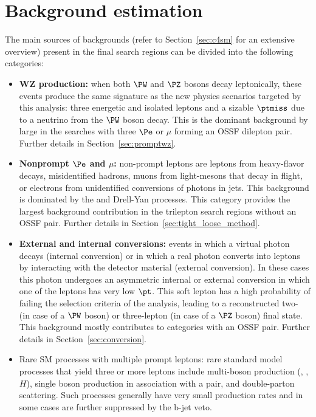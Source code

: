 \section{Background estimation}\label{sec:bgk}
The main sources of backgrounds (refer to Section~\ref{sec:c4sm} for
an extensive overview) present in the final search regions can be divided into the following categories:
\begin{itemize}
\setlength\itemsep{-0.1em}
\item {\bf WZ production:} when both $\PW$ and $\PZ$ bosons decay
  leptonically, these events produce the same signature as the new
  physics scenarios targeted by this analysis: three energetic and
  isolated leptons and a sizable $\ptmiss$ due to a neutrino from the
  $\PW$ boson decay. This is the dominant background by large in the
  searches with three $\Pe$ or $\mu$ forming an OSSF dilepton
  pair. Further details in Section~\ref{sec:promptwz}.

\item {\bf Nonprompt $\Pe$ and $\mu$:} non-prompt leptons are leptons
  from heavy-flavor decays, misidentified hadrons, muons from
  light-mesons that decay in flight, or electrons from unidentified
  conversions of  photons in jets. This background is dominated by the
  \ttbar and Drell-Yan processes. This category provides the largest
  background contribution in the trilepton search regions without an
  OSSF pair. Further details in Section~\ref{sec:tight_loose_method}.

\item {\bf External and internal conversions:} events in which a virtual photon decays (internal conversion) or in which a real photon
converts into leptons by interacting with the detector material
(external conversion). In these cases this photon undergoes an
asymmetric internal or external conversion in which one of the leptons
has very low $\pt$. This soft lepton has a high probability of failing
the selection criteria of the analysis, leading to a reconstructed
two- (in case of a $\PW$ boson) or three-lepton (in case of a $\PZ$
boson) final state. This background mostly contributes to categories
with an OSSF pair. Further details in Section~\ref{sec:conversion}.

\item Rare SM processes with multiple prompt leptons: rare standard
  model processes that yield three or more leptons include multi-boson
  production (\PW, \PZ, $H$), single boson
  production in association with a \ttbar pair, and double-parton
  scattering. Such processes generally have very small production rates
  and in some cases are further suppressed by the b-jet veto. 
\end{itemize}

